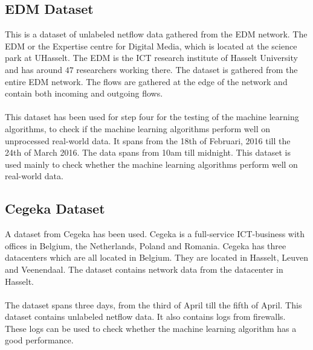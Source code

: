 \subsection{EDM Dataset}
This is a dataset of unlabeled netflow data gathered from the EDM network. The EDM or the Expertise centre for Digital Media, which is located at the science park at UHasselt. The EDM is the ICT research institute of Hasselt University and has around $47$ researchers working there. The dataset is gathered from the entire EDM network. The flows are gathered at the edge of the network and contain both incoming and outgoing flows. \\
\\
This dataset has been used for step four for the testing of the machine learning algorithms, to check if the machine learning algorithms perform well on unprocessed real-world data. It spans from the 18th of Februari, 2016 till the 24th of March  2016. The data spans from 10am till midnight. This dataset is used mainly to check whether the machine learning algorithms perform well on real-world data.

\subsection{Cegeka Dataset}
A dataset from Cegeka has been used. Cegeka is a full-service ICT-business with offices in Belgium, the Netherlands, Poland and Romania. Cegeka has three datacenters which are all located in Belgium. They are located in Hasselt, Leuven and Veenendaal. The dataset contains network data from the datacenter in Hasselt. \\
\\
The dataset spans three days, from the third of April till the  fifth of April. This dataset contains unlabeled netflow data. It also contains logs from firewalls. These logs can be used to check whether the machine learning algorithm has a good performance. 

